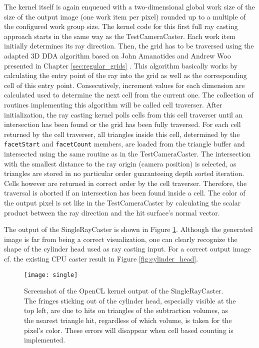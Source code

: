 The kernel itself is again enqueued with a two-dimensional global work size of the size of the output image (one work item per pixel) rounded up to a multiple of the configured work group size. The kernel code for this first full ray casting approach starts in the same way as the TestCameraCaster. Each work item initially determines its ray direction. Then, the grid has to be traversed using the adapted 3D DDA algorithm based on John Amanatides and Andrew Woo presented in Chapter \ref{sec:regular_grids} \cite{3DDDA}. This algorithm basically works by calculating the entry point of the ray into the grid as well as the corresponding cell of this entry point. Consecutively, increment values for each dimension are calculated used to determine the next cell from the current one. The collection of routines implementing this algorithm will be called cell traverser. After initialization, the ray casting kernel polls cells from this cell traverser until an intersection has been found or the grid has been fully traversed. For each cell returned by the cell traverser, all triangles inside this cell, determined by the \lstinline!facetStart! and \lstinline!facetCount! members, are loaded from the triangle buffer and intersected using the same routine as in the TestCameraCaster. The intersection with the smallest distance to the ray origin (camera position) is selected, as triangles are stored in no particular order guaranteeing depth sorted iteration. Cells however are returned in correct order by the cell traverser. Therefore, the traversal is aborted if an intersection has been found inside a cell. The color of the output pixel is set like in the TestCameraCaster by calculating the scalar product between the ray direction and the hit surface's normal vector.

The output of the SingleRayCaster is shown in Figure \ref{fig:single}. Although the generated image is far from being a correct visualization, one can clearly recognize the shape of the cylinder head used as ray casting input. For a correct output image cf. the existing CPU caster result in Figure \ref{fig:cylinder_head}.

\begin{figure}[h]
\centering
\texttt{[image: single]}
\caption[Screenshot of the OpenCL kernel output of the SingleRayCaster.]{Screenshot of the OpenCL kernel output of the SingleRayCaster. The fringes sticking out of the cylinder head, especially visible at the top left, are due to hits on triangles of the subtraction volumes, as the nearest triangle hit, regardless of which volume, is taken for the pixel's color. These errors will disappear when cell based counting is implemented.}
\label{fig:single}
\end{figure}


